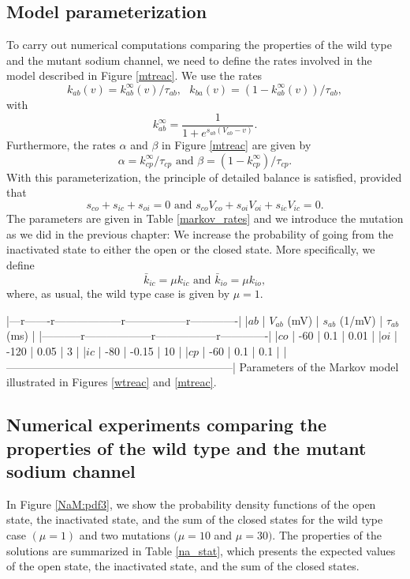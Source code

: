 \subsection{Model parameterization}
\label{modelparam}
To carry out numerical computations comparing the properties
of the  wild type and the mutant sodium channel, we need to define
the rates involved in the model described in Figure \ref{mtreac}. We use the 
rates
\[  k_{ab}(v) = k^{\infty}_{ab}(v)/\tau_{ab}, \ \ \  k_{ba}(v) = (1-k^{\infty}_{ab}(v))/\tau_{ab}, \]
with
\[k^{\infty}_{ab} = \frac{1}{1+e^{s_{a\!b}(V_{a\!b}-v)}}. \]
Furthermore, the rates $\alpha$ and $\beta$ in Figure \ref{mtreac} are given by
\[
\alpha =k^{\infty}_{cp}/\tau_{cp}  \text{ and } \beta =(1-k^{\infty}_{cp})/\tau_{cp}.
\]
With this parameterization, the principle of detailed balance is satisfied, provided that
\[ 
s_{co} + s_{ic} + s_{oi}=0 \mbox{\ \ and\ \ } s_{co}V_{co} + s_{oi}V_{oi} + s_{ic}V_{ic}  =0.  \]
The parameters are given in Table \ref{markov_rates} and we introduce the mutation as we
did in the previous chapter: We increase the probability of going from the
inactivated state to either the open or the closed state. More specifically, we define
\[
\bar{k}_{ic} = \mu k_{ic}  \text{ and } \bar{k}_{io} = \mu k_{io},
\] where, as usual, the wild type case is given by $\mu=1$. 

|---r-------r------------------r-----------------r-------------|
|$ab$ | $V_{ab}$ (mV) | $s_{ab}$ (1/mV) |  $\tau_{ab}$ (ms)    |
|-----------r------------------r-----------------r-------------|
|$co$ | -60           | 0.1             |  0.01                |
|$oi$ | -120          | 0.05            |  3                   |
|$ic$ | -80           | -0.15           |  10                  |
|$cp$ | -60           |  0.1            |  0.1                 |
|--------------------------------------------------------------|
Parameters of the Markov model illustrated in Figures \ref{wtreac} 
and \ref{mtreac}. 


\subsection{Numerical experiments comparing the properties of the wild type 
and the mutant sodium channel}



In Figure \ref{NaM:pdf3}, we show the
probability density functions of the open state, the inactivated state, and the
sum of the closed states for the wild type case $(\mu=1)$ and two mutations
$(\mu=10$ and $\mu=30).$ The properties of the solutions are summarized in
Table \ref{na_stat}, which presents the expected values of the open state, the
inactivated state, and the sum of the closed states.


